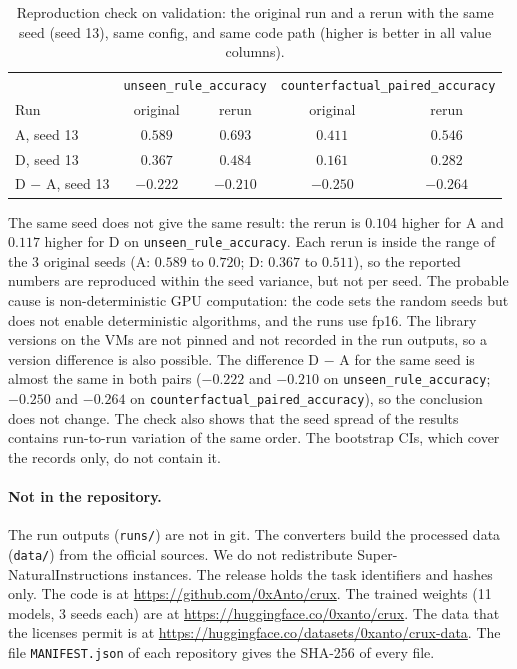 \documentclass[11pt,a4paper]{article}
\newcommand{\ura}{\texttt{unseen\_\allowbreak rule\_\allowbreak accuracy}}
\newcommand{\cpa}{\texttt{counterfactual\_\allowbreak paired\_\allowbreak accuracy}}
\begin{document}
\begin{table}[t]
\centering
\caption{Reproduction check on validation: the original run and a rerun with the same seed (seed 13), same config, and same code path (higher is better in all value columns).}
\label{tab:repro}
\begin{tabular}{lcccc}
\toprule
 & \multicolumn{2}{c}{\ura{}} & \multicolumn{2}{c}{\cpa{}} \\
Run & original & rerun & original & rerun \\
\midrule
A, seed 13 & $0.589$ & $0.693$ & $0.411$ & $0.546$ \\
D, seed 13 & $0.367$ & $0.484$ & $0.161$ & $0.282$ \\
D $-$ A, seed 13 & $-0.222$ & $-0.210$ & $-0.250$ & $-0.264$ \\
\bottomrule
\end{tabular}
\end{table}

The same seed does not give the same result: the rerun is $0.104$ higher for A and $0.117$ higher for D on \ura{}.
Each rerun is inside the range of the 3 original seeds (A: $0.589$ to $0.720$; D: $0.367$ to $0.511$), so the reported numbers are reproduced within the seed variance, but not per seed.
The probable cause is non-deterministic GPU computation: the code sets the random seeds but does not enable deterministic algorithms, and the runs use fp16.
The library versions on the VMs are not pinned and not recorded in the run outputs, so a version difference is also possible.
The difference D $-$ A for the same seed is almost the same in both pairs ($-0.222$ and $-0.210$ on \ura{}; $-0.250$ and $-0.264$ on \cpa{}), so the conclusion does not change.
The check also shows that the seed spread of the results contains run-to-run variation of the same order. The bootstrap CIs, which cover the records only, do not contain it.

\paragraph{Not in the repository.}
The run outputs (\texttt{runs/}) are not in git.
The converters build the processed data (\texttt{data/}) from the official sources.
We do not redistribute Super-NaturalInstructions instances.
The release holds the task identifiers and hashes only.
The code is at \url{https://github.com/0xAnto/crux}.
The trained weights (11 models, 3 seeds each) are at \url{https://huggingface.co/0xanto/crux}.
The data that the licenses permit is at \url{https://huggingface.co/datasets/0xanto/crux-data}.
The file \texttt{MANIFEST.json} of each repository gives the SHA-256 of every file.
\end{document}
